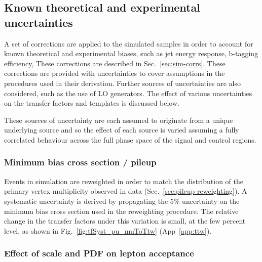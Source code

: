 
\subsection{Known theoretical and experimental uncertainties}
\label{sec:mc-variations}

A set of corrections are applied to the simulated samples in order to
account for known theoretical and experimental biases, such as jet
energy response, b-tagging efficiency, \etc These corrections are
described in Sec.~\ref{sec:sim-corrs}. These corrections are provided
with uncertainties to cover assumptions in the procedures used in
their derivation. Further sources of uncertainties are also
considered, such as the use of LO generators. The effect of various
uncertainties on the transfer factors and \HTmiss templates is
discussed below.

These sources of uncertainty are each assumed to originate from a
unique underlying source and so the effect of each source is varied
assuming a fully correlated behaviour across the full phase space of
the signal and control regions.

\subsubsection{Minimum bias cross section / pileup}
\label{sec:tfSyst_pu}

Events in simulation are reweighted in order to match the distribution
of the primary vertex multiplicity observed in data
(Sec.~\ref{sec:pileup-reweighting}).  A systematic uncertainty is
derived by propagating the 5\% uncertainty on the minimum bias cross
section used in the reweighting procedure.  The relative change in the
transfer factors under this variation is small, at the few percent
level, as shown in Fig.~\ref{fig:tfSyst_pu_muToTtw}
(App~\ref{app:ttw}).

\subsubsection{Effect of scale and PDF on lepton acceptance}
\label{sec:tfSyst_pdf}

